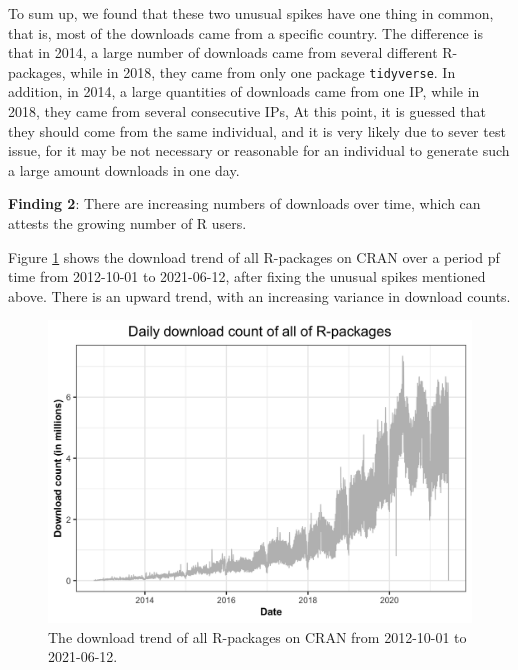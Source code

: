 \documentclass[
]{book}
\newenvironment{discovery}[1]{%
  \begin{tcolorbox}[colback=blue!30,colframe=blue!80!black]#1}{\end{tcolorbox}}
\begin{document}
To sum up, we found that these two unusual spikes have one thing in common, that is, most of the downloads came from a specific country. The difference is that in 2014, a large number of downloads came from several different R-packages, while in 2018, they came from only one package \texttt{tidyverse}. In addition, in 2014, a large quantities of downloads came from one IP, while in 2018, they came from several consecutive IPs, At this point, it is guessed that they should come from the same individual, and it is very likely due to sever test issue, for it may be not necessary or reasonable for an individual to generate such a large amount downloads in one day.

\begin{discovery}
\textbf{Finding 2}: There are increasing numbers of downloads over time,
which can attests the growing number of R users.
\end{discovery}

Figure \ref{fig:download-over-time} shows the download trend of all R-packages on CRAN over a period pf time from 2012-10-01 to 2021-06-12, after fixing the unusual spikes mentioned above. There is an upward trend, with an increasing variance in download counts.



\begin{figure}

{\centering \includegraphics{figures/download-over-time-1} 

}

\caption{The download trend of all R-packages on CRAN from 2012-10-01 to 2021-06-12.}\label{fig:download-over-time}
\end{figure}
\end{document}
